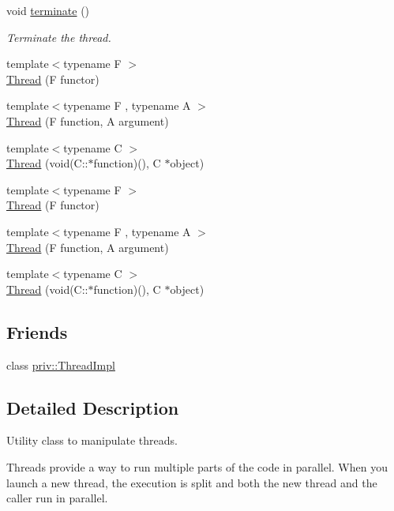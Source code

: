 \begin{DoxyCompactItemize}
void \hyperlink{classsf_1_1_thread_ad6b205d4f1ce38b8d44bba0f5501477c}{terminate} ()
\begin{DoxyCompactList}\small\item\em Terminate the thread. \end{DoxyCompactList}\item 
{\footnotesize template$<$typename F $>$ }\\\hyperlink{classsf_1_1_thread_a00b88f036de66eb63765f4c12ceb6870}{Thread} (F functor)
\item 
{\footnotesize template$<$typename F , typename A $>$ }\\\hyperlink{classsf_1_1_thread_a719b2cc067d92d52c35064a49d850a53}{Thread} (F function, A argument)
\item 
{\footnotesize template$<$typename C $>$ }\\\hyperlink{classsf_1_1_thread_aa9f473c8cbb078900c62b1fd14a83a34}{Thread} (void(C\-::$\ast$function)(), C $\ast$object)
\item 
{\footnotesize template$<$typename F $>$ }\\\hyperlink{classsf_1_1_thread_a00b88f036de66eb63765f4c12ceb6870}{Thread} (F functor)
\item 
{\footnotesize template$<$typename F , typename A $>$ }\\\hyperlink{classsf_1_1_thread_a719b2cc067d92d52c35064a49d850a53}{Thread} (F function, A argument)
\item 
{\footnotesize template$<$typename C $>$ }\\\hyperlink{classsf_1_1_thread_aa9f473c8cbb078900c62b1fd14a83a34}{Thread} (void(C\-::$\ast$function)(), C $\ast$object)
\end{DoxyCompactItemize}
\subsection*{Friends}
\begin{DoxyCompactItemize}
\item 
class \hyperlink{classsf_1_1_thread_a82dc12d2e90bdc557f3a20c61ac27700}{priv\-::\-Thread\-Impl}
\end{DoxyCompactItemize}


\subsection{Detailed Description}
Utility class to manipulate threads. 

Threads provide a way to run multiple parts of the code in parallel. When you launch a new thread, the execution is split and both the new thread and the caller run in parallel.

